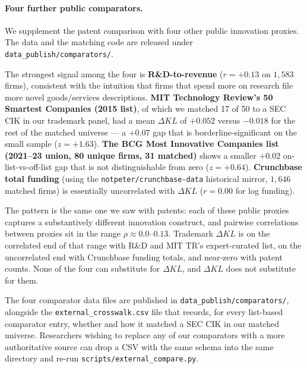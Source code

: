 \documentclass[11pt]{article}
\begin{document}
\paragraph{Four further public comparators.}
We supplement the patent comparison with four other public
innovation proxies. The data and the matching code are released
under \texttt{data\_publish/comparators/}.

\begin{table}[h]
\centering
\caption{Trademark $\Delta KL$ versus four external public
innovation comparators. R\&D-to-revenue and Crunchbase total funding
are continuous, so we report Pearson $r$. BCG Most Innovative
Companies and MIT Technology Review 50 Smartest Companies are
binary list memberships, so we report the difference in mean firm
$\Delta KL$ between firms on the list and the rest of the matched
universe (positive = listed firms are more innovative by our
measure).}
\label{tab:external}

\end{table}

The strongest signal among the four is \textbf{R\&D-to-revenue}
($r = +0.13$ on $1{,}583$ firms), consistent with the intuition
that firms that spend more on research file more novel
goods/services descriptions. \textbf{MIT Technology Review's 50
Smartest Companies (2015 list)}, of which we matched 17 of 50 to a
SEC CIK in our trademark panel, had a mean $\Delta KL$ of $+0.052$
versus $-0.018$ for the rest of the matched universe --- a $+0.07$
gap that is borderline-significant on the small sample
($z = +1.63$). \textbf{The BCG Most Innovative Companies list
(2021--23 union, 80 unique firms, 31 matched)} shows a smaller
$+0.02$ on-list-vs-off-list gap that is not distinguishable from
zero ($z = +0.64$). \textbf{Crunchbase total funding} (using the
\texttt{notpeter/crunchbase-data} historical mirror, $1{,}646$
matched firms) is essentially uncorrelated with $\Delta KL$
($r = 0.00$ for log funding).

The pattern is the same one we saw with patents: each of these
public proxies captures a substantively different innovation
construct, and pairwise correlations between proxies sit in the
range $\rho \approx 0.0$--$0.13$. Trademark $\Delta KL$ is on the
correlated end of that range with R\&D and MIT TR's expert-curated
list, on the uncorrelated end with Crunchbase funding totals, and
near-zero with patent counts. None of the four can substitute for
$\Delta KL$, and $\Delta KL$ does not substitute for them.

The four comparator data files are published in
\texttt{data\_publish/comparators/}, alongside the
\texttt{external\_crosswalk.csv} file that records, for every
list-based comparator entry, whether and how it matched a SEC CIK
in our matched universe. Researchers wishing to replace any of our
comparators with a more authoritative source can drop a CSV with
the same schema into the same directory and re-run
\texttt{scripts/external\_compare.py}.
\end{document}
